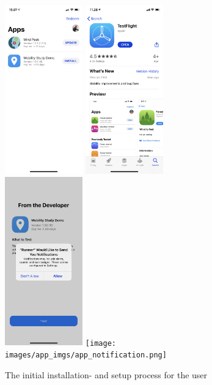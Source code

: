 \begin{figure}
    \centering
    \includegraphics[width=0.3\textwidth]{images/app_imgs/app_testflight.png} \includegraphics[width=0.3\textwidth]{images/app_imgs/app-appstore.png} \\
    \includegraphics[width=0.3\textwidth]{images/app_imgs/app_permission.png} \texttt{[image: images/app\_imgs/app\_notification.png]}
    \caption{The initial installation- and setup process for the user}
    \label{fig:my_label}
\end{figure}

